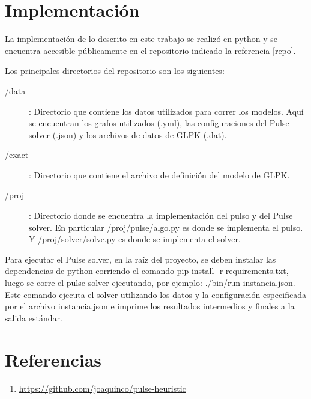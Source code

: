\documentclass{article}
\begin{document}
  \section*{Implementación}

  La implementación de lo descrito en este trabajo se realizó en python y se encuentra accesible públicamente en el repositorio indicado la referencia \ref{repo}.

  Los principales directorios del repositorio son los siguientes:

  \begin{description}
    \item[/data]: Directorio que contiene los datos utilizados para correr los modelos. Aquí se encuentran los grafos utilizados (.yml), las configuraciones del Pulse solver (.json) y los archivos de datos de GLPK (.dat).
    \item[/exact]: Directorio que contiene el archivo de definición del modelo de GLPK. 
    \item[/proj]: Directorio donde se encuentra la implementación del pulso y del Pulse solver. En particular /proj/pulse/algo.py es donde se implementa el pulso. Y /proj/solver/solve.py es donde se implementa el solver.
  \end{description}

  Para ejecutar el Pulse solver, en la raíz del proyecto, se deben instalar las dependencias de python corriendo el comando pip install -r requirements.txt, luego se corre el pulse solver ejecutando, por ejemplo: ./bin/run instancia.json. Este comando ejecuta el solver utilizando los datos y la configuración especificada por el archivo instancia.json e imprime los resultados intermedios y finales a la salida estándar.

  \section*{Referencias}

  \begin{enumerate}
    \item{ \label{repo} \url{https://github.com/joaquinco/pulse-heuristic}}
  \end{enumerate}
\end{document}
